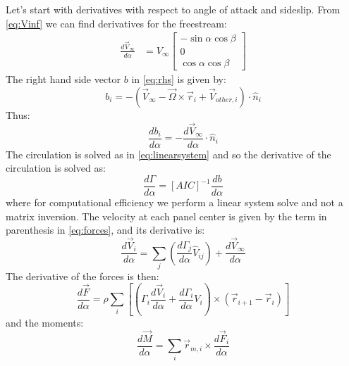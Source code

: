\documentclass{article}
\begin{document}
Let's start with derivatives with respect to angle of attack and sideslip.  From \cref{eq:Vinf} we can find derivatives for the freestream:
\begin{align}
\frac{d\vec{V}_{\infty}}{d\alpha} &= V_\infty
    \begin{bmatrix}
    -\sin\alpha\cos\beta\\
    0\\
    \cos\alpha\cos\beta
    \end{bmatrix}
\end{align}
The right hand side vector $b$ in \cref{eq:rhs} is given by:
\begin{equation}
b_i = - (\vec{V}_\infty - \vec{\Omega} \times \vec{r}_i +  \vec{V}_{other, i}) \cdot \hat{n}_{i}
\end{equation}
Thus:
\begin{equation}
\frac{d b_i}{d \alpha} = - \frac{d\vec{V}_{\infty}}{d\alpha} \cdot \hat{n}_i
\end{equation}
The circulation is solved as in \cref{eq:linearsystem} and so the derivative of the circulation is solved as:
\begin{equation}
 \frac{d \Gamma}{d \alpha} = [AIC]^{-1} \frac{d b}{d \alpha}
\end{equation}
where for computational efficiency we perform a linear system solve and not a matrix inversion.  The velocity at each panel center is given by the term in parenthesis in \cref{eq:forces}, and its derivative is:
\begin{equation}
\frac{d \vec{V}_i}{d \alpha} = \sum_j ( \frac{d \Gamma_j}{d \alpha}\hat{V}_{ij})+ \frac{d \vec{V}_\infty}{d \alpha}
\end{equation}
The derivative of the forces is then:
\begin{equation}
\frac{d \vec{F}}{d \alpha} = \rho \sum_i \left[\left(\Gamma_i \frac{d \vec{V}_i}{d \alpha} +  \frac{d \Gamma_i}{d\alpha} V_i \right) \times (\vec{r}_{i+1} - \vec{r}_{i}) \right]
\end{equation}
and the moments:
\begin{equation}
\frac{d\vec M}{d\alpha} = \sum_i \vec r_{m, i} \times \frac{d \vec{F}_i}{d\alpha}
\end{equation}
\end{document}
